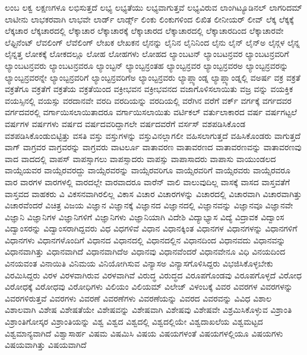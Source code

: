 {ಲಂಬ
ಲಕ್ವ
ಲಕ್ಷಣಗಳೂ
ಲಭಿಸುತ್ತದೆ
ಲಭ್ಯ
ಲಭ್ಯತೆಯು
ಲಭ್ಯವಾಗುತ್ತವೆ
ಲಭ್ಯವಿರುವ
ಲಾಂಗಿಟ್ಯೂಡಿನಲ್
ಲಾಗರಿದಮ್
ಲಾಟೀನು
ಲಾಭಕರವಾಗಿ
ಲಾಭವೇ
ಲಾರ್ಡ್
ಲಾರ್ಡ್ಸ್
ಲಿಂಕು
ಲಿಂಕುಗಳಿಂದ
ಲಿಖಿತ
ಲೀನೀಯರ್
ಲೀವ್
ಲೆಕ್ಕ
ಲೆಕ್ಕಕ್ಕೆ
ಲೆಕ್ಕಚಾರ
ಲೆಕ್ಕಚಾರದಲ್ಲಿ
ಲೆಕ್ಕಾಚಾರ
ಲೆಕ್ಕಾಚಾರಕ್ಕೆ
ಲೆಕ್ಕಾಚಾರದ
ಲೆಕ್ಕಾಚಾರದಲ್ಲಿ
ಲೆಕ್ಕಾಚಾರದಿಂದ
ಲೆಕ್ಕಾಚಾರವೇ
ಲೆಫ್ಟಿನೆಂಟ್
ಲೆವಲಿಂಗ್
ಲೆವೆಲಿಂಗ್
ಲೇಖಕ
ಲೇಖಕನ
ಲೈನನ್ನು
ಲೈನಿನ
ಲೈನಿನಿಂದ
ಲೈನು
ಲೈನ್
ಲೈನ್ಅ
ಲೈನ್ಗಳ
ಲೈನ್ನ
ಲೈನ್ನತ್ತ
ಲೋಕಕ್ಕೆ
ಲೋಕದಲ್ಲೂ
ಲೋಹ
ಲೋಹಗಳು
ಲೋಹದ
ಲ್ಯಾಂಬಟನ್
ಲ್ಯಾಂಬಟನ್ರವರ
ಲ್ಯಾಂಬಟನ್ರವರಿಗೆ
ಲ್ಯಾಂಬಟನ್ರವರು
ಲ್ಯಾಂಬಟನ್ರವರೂ
ಲ್ಯಾಂಬ್ಟನ್
ಲ್ಯಾಂಬ್ಟನ್ರಂತಹ
ಲ್ಯಾಂಬ್ಟನ್ರವರ
ಲ್ಯಾಂಬ್ಟನ್ರವರಅ
ಲ್ಯಾಂಬ್ಟನ್ರವರನ್ನು
ಲ್ಯಾಂಬ್ಟನ್ರವರನ್ನೇ
ಲ್ಯಾಂಬ್ಟನ್ರವರಿಗೆ
ಲ್ಯಾಂಬ್ಟನ್ರವರಿಗೆಅ
ಲ್ಯಾಂಬ್ಟನ್ರವರು
ಲ್ಯಾಪ್ಲ್ಯಾಂಡ್ನ
ಲ್ಯಾಪ್ಲ್ಯಾಂಡ್ನಲ್ಲಿ
ವಅರ್ಷ
ವಕ್ರ
ವಕ್ರತೆ
ವಕ್ರತೆಗೂ
ವಕ್ರತೆಗೆ
ವಕ್ರತೆಯ
ವಕ್ರತೆಯಿಂದ
ವಕ್ರೀಭವನ
ವಕ್ರೀಭವನದ
ವಜಾಗೊಳಿಸಲಾಯಿತು
ವಜ್ರ
ವನ್ನು
ವಯಕ್ತಿಕ
ವಯಸ್ಸಿನಲ್ಲಿ
ವಯಸ್ಸು
ವರದಾನವೇ
ವರದಿ
ವರದಿಯನ್ನು
ವರದಿಯಲ್ಲಿ
ವರೆಗಿನ
ವರೆಗೆ
ವರ್ಕ್
ವರ್ಗಕ್ಕೆ
ವರ್ಗದವರ
ವರ್ಗದವರಲ್ಲಿ
ವರ್ಗಾಯಿಸಲಾಯಿತಾದರೂ
ವರ್ಗಾಯಿಸಲಾಯಿತು
ವರ್ಟಿಕಲ್
ವರ್ತುಲಾಕಾರದ
ವರ್ಷ
ವರ್ಷಗಟ್ಟಲೆ
ವರ್ಷಗಳ
ವರ್ಷಗಳು
ವರ್ಷದ
ವರ್ಷದವರಿದ್ದಾಗಲೇ
ವರ್ಷದವರೆಗೆ
ವರ್ಸಸ್
ವಶಪಡಿಸಿಕೊಂಡ
ವಶಪಡಿಸಿಕೊಂಡುಬಿಟ್ಟಿತ್ತು
ವಸತಿ
ವಸ್ತು
ವಸ್ತುಗಳನ್ನು
ವಸ್ತುವಿನಲ್ಲಾಗಲೀ
ವಹಿಸಲಾಗುತ್ತದೆ
ವಹಿಸಿಕೊಂಡರು
ವಾಗುತ್ತದೆ
ವಾಗ್
ವಾಗ್ರವರ
ವಾಗ್ರವರನ್ನು
ವಾಗ್ರವರು
ವಾಟರ್ಲೂ
ವಾತಾವರಣ
ವಾತಾವರಣದ
ವಾತಾವರಣವನ್ನು
ವಾತಾವರಣವು
ವಾದ
ವಾದದಲ್ಲಿ
ವಾಪಸ್
ವಾಪಸ್ಸಾಗಲು
ವಾಪಸ್ಸಾದರು
ವಾಪಸ್ಸು
ವಾಪಾಸಾದರು
ವಾಪಾಸು
ವಾಯುಂಡಲದ
ವಾಯ್ಸೆಯವರ
ವಾಯ್ಸೆರವರದ್ದು
ವಾಯ್ಸೆರವರನ್ನು
ವಾಯ್ಸೆರವರಿಗೂ
ವಾಯ್ಸೆರವರಿಗೆ
ವಾಯ್ಸೆರವರು
ವಾಯ್ಸೆರವರೂ
ವಾರ
ವಾರಗಳ
ವಾರಗಳಲ್ಲಿ
ವಾರದಲ್ಲೇ
ವಾರವಾದರೂ
ವಾರೆನ್
ವಾಲಿ
ವಾಲುವುದಿಲ್ಲ
ವಾಸಕ್ಕೆ
ವಾಸದ
ವಾಸ್ತವತೆಗೆ
ವಾಸ್ತವದ
ವಾಹಕರು
ವಿ
ವಿಕಸನವಾಗಿರಲಿಲ್ಲ
ವಿಕಾಸ
ವಿಚಾರ
ವಿಚಾರಗಳನ್ನು
ವಿಚಾರದಲ್ಲಿ
ವಿಚಾರವಾಗಿ
ವಿಚಾರವಾಗಿತ್ತು
ವಿಚಾರವೆಂದರೆ
ವಿಚಿತ್ರ
ವಿಜಯ
ವಿಜ್ಞಾನ
ವಿಜ್ಞಾನಕ್ಕೆ
ವಿಜ್ಞಾನದ
ವಿಜ್ಞಾನದಲ್ಲಿ
ವಿಜ್ಞಾನವನ್ನು
ವಿಜ್ಞಾನವೂ
ವಿಜ್ಞಾನವೇ
ವಿಜ್ಞಾನಿ
ವಿಜ್ಞಾನಿಗಳ
ವಿಜ್ಞಾನಿಗಳಿಗೆ
ವಿಜ್ಞಾನಿಗಳು
ವಿಜ್ಞಾನಿಯಾಗಿ
ವಿದೇಶಿ
ವಿದ್ಯಾಭ್ಯಾಸ
ವಿದ್ಯೆ
ವಿದ್ರಾವಕ
ವಿದ್ವಾಂಸ
ವಿದ್ವಾಂಸರನ್ನು
ವಿದ್ವಾಂಸರಾಗಿದ್ದವರು
ವಿಧ
ವಿಧಗಳಿವೆ
ವಿಧಾನ
ವಿಧಾನಕ್ಕಿಂತ
ವಿಧಾನಗಳ
ವಿಧಾನಗಳನ್ನು
ವಿಧಾನಗಳಿಗೆ
ವಿಧಾನಗಳು
ವಿಧಾನಗಳೊಂದಿಗೆ
ವಿಧಾನದ
ವಿಧಾನದಲ್ಲಿ
ವಿಧಾನದಲ್ಲಿನ
ವಿಧಾನದಿಂದ
ವಿಧಾನವದು
ವಿಧಾನವನ್ನು
ವಿಧಾನವಾಗಿತ್ತು
ವಿಧಾನವಾಗಿದೆ
ವಿಧಾನವಾಗಿದೆಅ
ವಿಧಾನವು
ವಿಧಾನವೆಂದರೆ
ವಿಧಾನವೇನೂ
ವಿಧಿ
ವಿನಯದಿಂದ
ವಿನಯವಂತ
ವಿನಾಯಿತಿ
ವಿನಿಮಯ
ವಿನಿಯೋಗಿಸುವ
ವಿನ್ಯಾಸಅ
ವಿನ್ಯಾಸಗೊಳಿಸಿದ್ದರು
ವಿಭಜಿಸಿಕೊಳ್ಳಬೇಕು
ವಿರಮಿಸಿದ್ದರು
ವಿರಳ
ವಿರಳವಾಗಿರುವ
ವಿರಳವಾಗಿವೆ
ವಿರುದ್ಧ
ವಿರುದ್ಧದ
ವಿರೂಪಗೊಂಡವು
ವಿರೂಪಗೊಳ್ಳದೆ
ವಿರೋಧ
ವಿರೋಧಕ್ಕೆ
ವಿರೋಧವು
ವಿರೋಧಿಗಳು
ವಿಲಿಯಂ
ವಿಲಿಯಮ್
ವಿಲೇಜ್
ವಿಳಂಬಕ್ಕೆ
ವಿವರ
ವಿವರಗಳ
ವಿವರಗಳನ್ನು
ವಿವರಗಳಿರುತ್ತವೆ
ವಿವರಗಳು
ವಿವರಣೆ
ವಿವರಣೆಗಳು
ವಿವರಣೆಯನ್ನು
ವಿವರದ
ವಿವರವನ್ನು
ವಿವಿಧ
ವಿಶಾಲ
ವಿಶಾಲವಾಗಿ
ವಿಶೇಷ
ವಿಶೇಷತೆಯೇ
ವಿಶೇಷವನ್ನು
ವಿಶೇಷವಾಗಿ
ವಿಶೇಷವು
ವಿಶೇಷವೇ
ವಿಶ್ರಮಿಸಿಕೊಳ್ಳುವ
ವಿಶ್ರಾಂತಿ
ವಿಶ್ರಾಂತಿಗೋಸ್ಕರ
ವಿಶ್ರಾಂತಿಯನ್ನು
ವಿಶ್ವ
ವಿಶ್ವದ
ವಿಶ್ವದಲ್ಲಿ
ವಿಶ್ವದಲ್ಲಿಯೇ
ವಿಶ್ವದಾಖಲೆಯ
ವಿಶ್ವಮಟ್ಟದ
ವಿಶ್ವಮಾನ್ಯವಾಗಿದೆ
ವಿಶ್ವಾಸಾರ್ಹ
ವಿಷಮ
ವಿಷಮಿಸಿ
ವಿಷಯ
ವಿಷಯಗಳಂತೆ
ವಿಷಯಗಳಲ್ಲಿಯೂ
ವಿಷಯಗಳು
ವಿಷಯವಾಗಿತ್ತು
ವಿಷಯವಾಗಿದೆ
}
